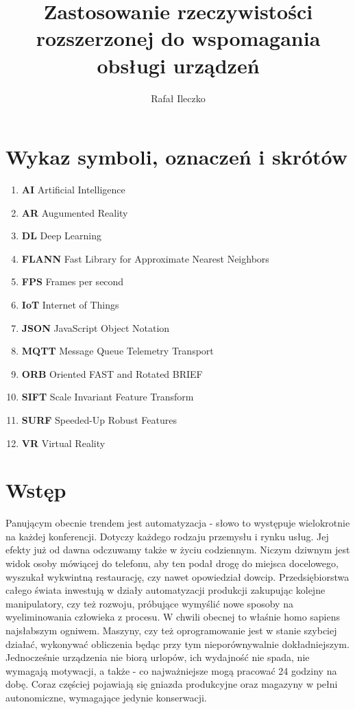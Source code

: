 \documentclass[12pt,twoside,polish]{article}
\author{Rafał Ileczko}
\title{Zastosowanie rzeczywistości rozszerzonej do wspomagania obsługi urządzeń}
\begin{document}
\maketitle

\blankpage

\tableofcontents

\clearpage
\blankpage


\section*{Wykaz symboli, oznaczeń i skrótów}
\begin{enumerate}
	\item[] \textbf{AI} Artificial Intelligence
	\item[] \textbf{AR} Augumented Reality
	\item[] \textbf{DL} Deep Learning
	\item[] \textbf{FLANN} Fast Library for Approximate Nearest Neighbors
	\item[] \textbf{FPS} Frames per second
	\item[] \textbf{IoT} Internet of Things
	\item[] \textbf{JSON} JavaScript Object Notation
	\item[] \textbf{MQTT} Message Queue Telemetry Transport
	\item[] \textbf{ORB} Oriented FAST and Rotated BRIEF
	\item[] \textbf{SIFT} Scale Invariant Feature Transform
	\item[] \textbf{SURF}  Speeded-Up Robust Features
	\item[] \textbf{VR} Virtual Reality
\end{enumerate}

%



\clearpage


\section{Wstęp}

Panującym obecnie trendem jest automatyzacja - słowo to występuje wielokrotnie na każdej konferencji. Dotyczy każdego rodzaju przemysłu i rynku usług. Jej efekty już od dawna odczuwamy także w życiu codziennym. Niczym dziwnym jest widok osoby mówiącej do telefonu, aby ten podał drogę do miejsca docelowego, wyszukał wykwintną restaurację, czy nawet opowiedział dowcip. Przedsiębiorstwa całego świata inwestują w działy automatyzacji produkcji zakupując kolejne manipulatory, czy też rozwoju, próbujące wymyślić nowe sposoby na wyeliminowania człowieka z procesu. W chwili obecnej to właśnie homo sapiens najsłabszym ogniwem. Maszyny, czy też oprogramowanie jest w stanie szybciej działać, wykonywać obliczenia będąc przy tym nieporównywalnie dokładniejszym. Jednocześnie urządzenia nie biorą urlopów, ich wydajność nie spada, nie wymagają motywacji, a także - co najważniejsze  mogą pracować 24 godziny na dobę. Coraz częściej pojawiają się gniazda produkcyjne oraz magazyny w pełni autonomiczne, wymagające jedynie konserwacji.
\end{document}
